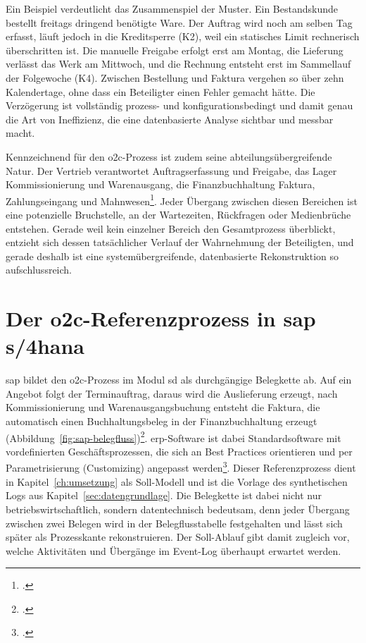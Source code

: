Ein Beispiel verdeutlicht das Zusammenspiel der Muster. Ein Bestandskunde bestellt freitags dringend benötigte Ware. Der Auftrag wird noch am selben Tag erfasst, läuft jedoch in die Kreditsperre (K2), weil ein statisches Limit rechnerisch überschritten ist. Die manuelle Freigabe erfolgt erst am Montag, die Lieferung verlässt das Werk am Mittwoch, und die Rechnung entsteht erst im Sammellauf der Folgewoche (K4). Zwischen Bestellung und Faktura vergehen so über zehn Kalendertage, ohne dass ein Beteiligter einen Fehler gemacht hätte. Die Verzögerung ist vollständig prozess- und konfigurationsbedingt und damit genau die Art von Ineffizienz, die eine datenbasierte Analyse sichtbar und messbar macht.

Kennzeichnend für den \gls{o2c}-Prozess ist zudem seine abteilungsübergreifende Natur. Der Vertrieb verantwortet Auftragserfassung und Freigabe, das Lager Kommissionierung und Warenausgang, die Finanzbuchhaltung Faktura, Zahlungseingang und Mahnwesen\footcites(Vgl.)()[S.~63 ff.]{scheibler2021vertrieb}[S.~109 f.]{nadukuru2024o2c}. Jeder Übergang zwischen diesen Bereichen ist eine potenzielle Bruchstelle, an der Wartezeiten, Rückfragen oder Medienbrüche entstehen. Gerade weil kein einzelner Bereich den Gesamtprozess überblickt, entzieht sich dessen tatsächlicher Verlauf der Wahrnehmung der Beteiligten, und gerade deshalb ist eine systemübergreifende, datenbasierte Rekonstruktion so aufschlussreich.

\section{Der \gls{o2c}-Referenzprozess in \gls{sap} \gls{s/4hana}}\label{sec:o2c-referenzprozess}

\gls{sap} bildet den \gls{o2c}-Prozess im Modul \gls{sd} als durchgängige Belegkette ab. Auf ein Angebot folgt der Terminauftrag, daraus wird die Auslieferung erzeugt, nach Kommissionierung und Warenausgangsbuchung entsteht die Faktura, die automatisch einen Buchhaltungsbeleg in der Finanzbuchhaltung erzeugt (Abbildung~\ref{fig:sap-belegfluss})\footcite[Vgl.][S.~63 ff.]{scheibler2021vertrieb}. \gls{erp}-Software ist dabei Standardsoftware mit vordefinierten Geschäftsprozessen, die sich an Best Practices orientieren und per Parametrisierung (Customizing) angepasst werden\footcite[Vgl.][S.~4]{gronau2014erp}. Dieser Referenzprozess dient in Kapitel~\ref{ch:umsetzung} als Soll-Modell und ist die Vorlage des synthetischen Logs aus Kapitel~\ref{sec:datengrundlage}. Die Belegkette ist dabei nicht nur betriebswirtschaftlich, sondern datentechnisch bedeutsam, denn jeder Übergang zwischen zwei Belegen wird in der Belegflusstabelle festgehalten und lässt sich später als Prozesskante rekonstruieren. Der Soll-Ablauf gibt damit zugleich vor, welche Aktivitäten und Übergänge im Event-Log überhaupt erwartet werden.

